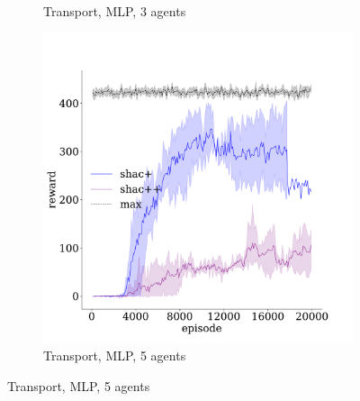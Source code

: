 \begin{figure}[!t]
\begin{subfigure}[b]{0.32\textwidth}
        \caption{Transport, MLP, 3 agents}
        \label{fig:transport-ablation-mlp-3}
    \end{subfigure}
    \begin{subfigure}[b]{0.32\textwidth}
        \includegraphics[width=\textwidth]{figs/transport-ablation-5-mlp.pdf}
        \caption{Transport, MLP, 5 agents}
        \label{fig:transport-ablation-mlp-5}
    \end{subfigure}


\end{figure}
